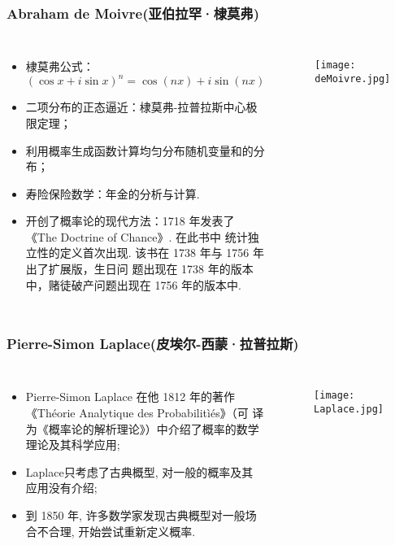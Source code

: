 \begin{frame}
  \frametitle{{\rm Abraham de Moivre}(亚伯拉罕·棣莫弗)}
  \vspace{-0.15cm}
  \begin{columns}
    \column{6.5cm}
    \begin{itemize}[<+-|alert@+>]
    \item 棣莫弗公式：$$(\cos x+i\sin x)^n=\cos(nx)+i \sin(nx)$$

    \item 二项分布的正态逼近：棣莫弗-拉普拉斯中心极限定理；
    \item 利用概率生成函数计算均匀分布随机变量和的分布；
    \item 寿险保险数学：年金的分析与计算.
    \item 开创了概率论的现代方法：1718 年发表了《The Doctrine of Chance》. 在此书中
	统计独立性的定义首次出现. 该书在 1738 年与 1756 年出了扩展版，生日问
	题出现在 1738 年的版本中，赌徒破产问题出现在 1756 年的版本中.
    \end{itemize}

    \column{5cm}

    \begin{figure}[htbp]
      \centering
      \texttt{[image: deMoivre.jpg]}
    \end{figure}
  \end{columns}
\end{frame}












\begin{frame}
  \frametitle{{\rm Pierre-Simon Laplace}(皮埃尔-西蒙·拉普拉斯)}
  \begin{columns}
    \column{6cm}
    \begin{itemize}[<+-|alert@+>]
    \item {\rm Pierre-Simon Laplace} 在他 1812 年的著作{\rm 《Th{\'e}orie Analytique des Probabilit{\`i}{\'e}s》}（可
	译为《概率论的解析理论》）中介绍了概率的数学理论及其科学应用;

    \item {\rm Laplace}只考虑了古典概型, 对一般的概率及其应用没有介绍;
    \item 到 1850 年, 许多数学家发现古典概型对一般场合不合理, 开始尝试重新定义概率.
    \end{itemize}

    \column{5cm}

    \begin{figure}[htbp]
      \centering
      \texttt{[image: Laplace.jpg]}
    \end{figure}
  \end{columns}
\end{frame}




